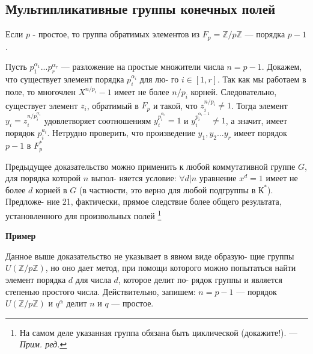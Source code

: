 \documentclass{../template/mai_book}
\begin{document}
\subsection{Мультипликативные группы конечных полей}
\begin{predl}
Если $p$ - простое, то группа обратимых элементов из $F_p = \mathbb{Z}/ p \mathbb{Z}$ ---\linebreak
порядка $p-1$.
\end{predl}
\begin{myproof}
Пусть $p_{1}^{\alpha_1} ...p_{r}^{\alpha_r}$ --- разложение на простые множители числа\linebreak
$n = p - 1$. Докажем, что существует элемент порядка $p_{i}^{\alpha_i}$ для лю-\linebreak
го $i \in [1, r]$. Так как мы работаем в поле, то многочлен $X^{n/p_i}-1$\linebreak
имеет не более $n/p_i$ корней. Следовательно, существует элемент $z_i$,
обратимый в $F_p$ и такой, что $z_i^{n/p_i} \ne 1$. Тогда элемент $y_i = z_i^{n/p_i^{\alpha_i}}$ удовлетворяет соотношениям $y_i^{p_i^{\alpha_i}} = 1$ и $y_i^{p_i^{\alpha_i - 1}} \ne 1$, а значит, имеет порядок $p_i^{a_i}$. Нетрудно проверить, что произведение $y_1,y_2...y_r$\linebreak
имеет порядок $p-1$ в $F_p^*$
\end{myproof}
\begin{mynotice}
Предыдущее доказательство можно применить к\linebreak
любой коммутативной группе $G$, для порядка которой $n$ выпол­-\linebreak
няется условие: $\forall d | n$ уравнение $x^d = 1$ имеет не более $d$ корней в\linebreak
$G$ (в частности, это верно для любой подгруппы в $К^*$). Предложе­-\linebreak
ние 21, фактически, прямое следствие более общего результата,\linebreak
установленного для произвольных полей
\footnote{На самом деле указанная группа обязана быть циклической (докажите!). --- \linebreak \textit{Прим. ред.}}
\end{mynotice}
\textbf{Пример}

Данное выше доказательство не указывает в явном виде образую­-\linebreak
щие группы $U(\mathbb{Z}/p\mathbb{Z})$, но оно дает метод, при помощи которого можно\linebreak
попытаться найти элемент порядка $d$ для числа $d$, которое делит по­-\linebreak
рядок группы и является степенью простого числа. Действительно,\linebreak
запишем: $n = p - 1$ — порядок $U(\mathbb{Z}/p\mathbb{Z})$ и $q^{\alpha}$ делит $n$ и $q$ — простое.\linebreak
\end{document}
